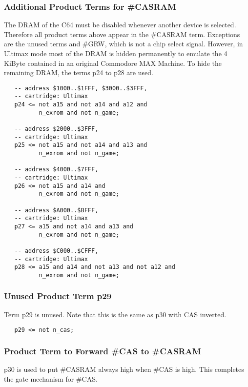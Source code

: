 \subsubsection{Additional Product Terms for \#CASRAM}

The DRAM of the C64 must be disabled whenever another device is selected.
Therefore all product terms above appear in the \#CASRAM term. Exceptions
are the unused terms and \#GRW, which is not a chip select signal. However,
in Ultimax mode most of the DRAM is hidden permanently to emulate the 4
KiByte contained in an original Commodore MAX Machine. To hide the remaining
DRAM, the terms p24 to p28 are used.

\begin{lstlisting}
   -- address $1000..$1FFF, $3000..$3FFF,
   -- cartridge: Ultimax
   p24 <= not a15 and not a14 and a12 and
          n_exrom and not n_game;

   -- address $2000..$3FFF,
   -- cartridge: Ultimax
   p25 <= not a15 and not a14 and a13 and
          n_exrom and not n_game;

   -- address $4000..$7FFF,
   -- cartridge: Ultimax
   p26 <= not a15 and a14 and
          n_exrom and not n_game;

   -- address $A000..$BFFF,
   -- cartridge: Ultimax
   p27 <= a15 and not a14 and a13 and
          n_exrom and not n_game;

   -- address $C000..$CFFF,
   -- cartridge: Ultimax
   p28 <= a15 and a14 and not a13 and not a12 and
          n_exrom and not n_game;
\end{lstlisting}

\subsubsection{Unused Product Term p29}

Term p29 is unused. Note that this is the same as p30 with CAS inverted.

\begin{lstlisting}
   p29 <= not n_cas;
\end{lstlisting}

\subsubsection{Product Term to Forward \#CAS to \#CASRAM}

p30 is used to put \#CASRAM always high when \#CAS is
high. This completes the gate mechanism for \#CAS.

